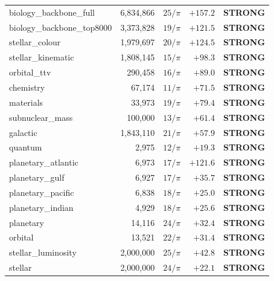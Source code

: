 \documentclass[11pt, letterpaper, openany]{book}
\begin{document}
\begin{longtable}{|l|r|l|r|l|}
\rowcolor{backbonegreen!10}
biology\_backbone\_full     & 6,834,866 & $25/\pi$ & $+157.2$ & \textbf{STRONG} \\
\rowcolor{backbonegreen!7}
biology\_backbone\_top8000  & 3,373,828 & $19/\pi$ & $+121.5$ & \textbf{STRONG} \\
\rowcolor{colourgold!12}
stellar\_colour             & 1,979,697 & $20/\pi$ & $+124.5$ & \textbf{STRONG} \\
\rowcolor{kishblue!8}
stellar\_kinematic          & 1,808,145 & $15/\pi$ & $+98.3$  & \textbf{STRONG} \\
\rowcolor{signalred!7}
orbital\_ttv                & 290,458   & $16/\pi$ & $+89.0$  & \textbf{STRONG} \\
\rowcolor{orange!8}
chemistry                   & 67,174    & $11/\pi$ & $+71.5$  & \textbf{STRONG} \\
\rowcolor{red!6}
materials                   & 33,973    & $19/\pi$ & $+79.4$  & \textbf{STRONG} \\
\rowcolor{subnucleargold!10}
subnuclear\_mass            & 100,000   & $13/\pi$ & $+61.4$  & \textbf{STRONG} \\
\rowcolor{kishblue!5}
galactic                    & 1,843,110 & $21/\pi$ & $+57.9$  & \textbf{STRONG} \\
\rowcolor{violet!5}
quantum                     & 2,975     & $12/\pi$ & $+19.3$  & \textbf{STRONG} \\
\rowcolor{tidalblue!6}
planetary\_atlantic         & 6,973     & $17/\pi$ & $+121.6$ & \textbf{STRONG} \\
\rowcolor{tidalblue!5}
planetary\_gulf             & 6,927     & $17/\pi$ & $+35.7$  & \textbf{STRONG} \\
\rowcolor{tidalblue!5}
planetary\_pacific          & 6,838     & $18/\pi$ & $+25.0$  & \textbf{STRONG} \\
\rowcolor{tidalblue!4}
planetary\_indian           & 4,929     & $18/\pi$ & $+25.6$  & \textbf{STRONG} \\
\rowcolor{tidalblue!4}
planetary                   & 14,116    & $24/\pi$ & $+32.4$  & \textbf{STRONG} \\
\rowcolor{orange!5}
orbital                     & 13,521    & $22/\pi$ & $+31.4$  & \textbf{STRONG} \\
\rowcolor{luminorange!5}
stellar\_luminosity         & 2,000,000 & $25/\pi$ & $+42.8$  & \textbf{STRONG} \\
\rowcolor{kishblue!4}
stellar                     & 2,000,000 & $24/\pi$ & $+22.1$  & \textbf{STRONG} \\

\end{longtable}
\end{document}
